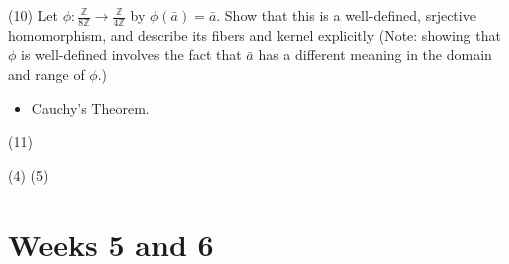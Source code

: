 \documentclass[1    0pt, answers]{exam} \renewcommand{\baselinestretch}{1.05}
\theoremstyle{plain}
\theoremstyle{definition}
\begin{document}
\begin{questions}
\question (10) Let $\phi : \frac{\mathbb{Z}}{8 \mathbb{Z}} \to \frac{\mathbb{Z}}{4 \mathbb{Z}}$ by $\phi(\bar{a}) = \bar{a}$. Show that this is a well-defined, srjective homomorphism, and describe its fibers and kernel explicitly (Note: showing that $\phi$ is well-defined involves the fact that $\bar{a}$ has a different meaning in the domain and range of $\phi$.)

\begin{itemize}
\item Cauchy's Theorem.
\end{itemize}

\question (11)

\question (4)
\question (5)


\end{questions}

\section{Weeks 5 and 6}
\end{document}
